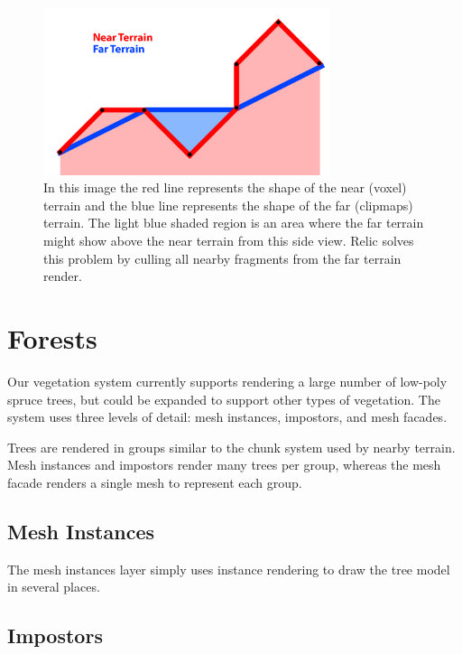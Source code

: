\begin{figure}
	\centering
		\includegraphics[width=0.75\textwidth]{figures/terrain_overlap.png}
	\caption{
		In this image the red line represents the shape of the near (voxel) terrain and the blue line represents the shape of the far (clipmaps) terrain.
		The light blue shaded region is an area where the far terrain might show above the near terrain from this side view.
		Relic solves this problem by culling all nearby fragments from the far terrain render.
	}
	\label{fig:terrain_overlap}
\end{figure}


\section{Forests} \label{forests} %

Our vegetation system currently supports rendering a large number of low-poly spruce trees, but could be expanded to support other types of vegetation.
The system uses three levels of detail: mesh instances, impostors, and mesh facades.

Trees are rendered in groups similar to the chunk system used by nearby terrain.
Mesh instances and impostors render many trees per group, whereas the mesh facade renders a single mesh to represent each group.

\subsection{Mesh Instances}

The mesh instances layer simply uses instance rendering to draw the tree model in several places.

\subsection{Impostors}

